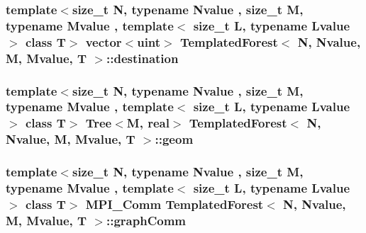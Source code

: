 \label{classTemplatedForest_ae035f47727cbf2b23e423c48b6dea3db}
\hypertarget{classTemplatedForest_acd86a531acf3af46b1efc635301edd64}{
\subsubsection[{destination}]{\setlength{\rightskip}{0pt plus 5cm}template$<$size\_\-t N, typename Nvalue , size\_\-t M, typename Mvalue , template$<$ size\_\-t L, typename Lvalue $>$ class T$>$ vector$<$uint$>$ {\bf TemplatedForest}$<$ N, Nvalue, M, Mvalue, T $>$::{\bf destination}}}
\label{classTemplatedForest_acd86a531acf3af46b1efc635301edd64}
\hypertarget{classTemplatedForest_a269716c3758205686408d0ba4d40e1ea}{
\subsubsection[{geom}]{\setlength{\rightskip}{0pt plus 5cm}template$<$size\_\-t N, typename Nvalue , size\_\-t M, typename Mvalue , template$<$ size\_\-t L, typename Lvalue $>$ class T$>$ {\bf Tree}$<$M, real$>$ {\bf TemplatedForest}$<$ N, Nvalue, M, Mvalue, T $>$::{\bf geom}}}
\label{classTemplatedForest_a269716c3758205686408d0ba4d40e1ea}
\hypertarget{classTemplatedForest_ad6be6bd985ac82d6e6b9c6caa288f87b}{
\subsubsection[{graphComm}]{\setlength{\rightskip}{0pt plus 5cm}template$<$size\_\-t N, typename Nvalue , size\_\-t M, typename Mvalue , template$<$ size\_\-t L, typename Lvalue $>$ class T$>$ MPI\_\-Comm {\bf TemplatedForest}$<$ N, Nvalue, M, Mvalue, T $>$::{\bf graphComm}}}
\label{classTemplatedForest_ad6be6bd985ac82d6e6b9c6caa288f87b}
